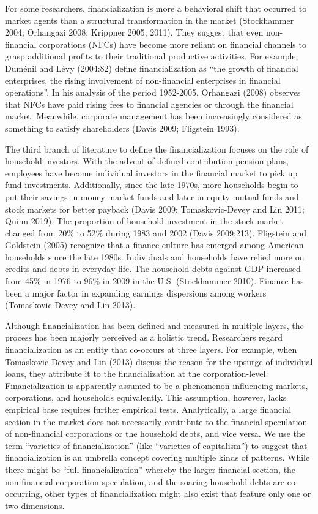 \documentclass[
]{article}
\begin{document}
For some researchers, financialization is more a behavioral shift that
occurred to market agents than a structural transformation in the market
(Stockhammer 2004; Orhangazi 2008; Krippner 2005; 2011). They suggest
that even non-financial corporations (NFCs) have become more reliant on
financial channels to grasp additional profits to their traditional
productive activities. For example, Duménil and Lévy (2004:82) define
financialization as ``the growth of financial enterprises, the rising
involvement of non-financial enterprises in financial operations''. In
his analysis of the period 1952-2005, Orhangazi (2008) observes that
NFCs have paid rising fees to financial agencies or through the
financial market. Meanwhile, corporate management has been increasingly
considered as something to satisfy shareholders (Davis 2009; Fligstein
1993).

The third branch of literature to define the financialization focuses on
the role of household investors. With the advent of defined contribution
pension plans, employees have become individual investors in the
financial market to pick up fund investments. Additionally, since the
late 1970s, more households begin to put their savings in money market
funds and later in equity mutual funds and stock markets for better
payback (Davis 2009; Tomaskovic-Devey and Lin 2011; Quinn 2019). The
proportion of household investment in the stock market changed from 20\%
to 52\% during 1983 and 2002 (Davis 2009:213). Fligstein and Goldstein
(2005) recognize that a finance culture has emerged among American
households since the late 1980s. Individuals and households have relied
more on credits and debts in everyday life. The household debts against
GDP increased from 45\% in 1976 to 96\% in 2009 in the U.S. (Stockhammer
2010). Finance has been a major factor in expanding earnings dispersions
among workers (Tomaskovic-Devey and Lin 2013).

Although financialization has been defined and measured in multiple
layers, the process has been majorly perceived as a holistic trend.
Researchers regard financialization as an entity that co-occurs at three
layers. For example, when Tomaskovic-Devey and Lin (2013) discuss the
reason for the upsurge of individual loans, they attribute it to the
financialization at the corporation-level. Financialization is
apparently assumed to be a phenomenon influencing markets, corporations,
and households equivalently. This assumption, however, lacks empirical
base requires further empirical tests. Analytically, a large financial
section in the market does not necessarily contribute to the financial
speculation of non-financial corporations or the household debts, and
vice versa. We use the term ``varieties of financialization'' (like
``varieties of capitalism'') to suggest that financialization is an
umbrella concept covering multiple kinds of patterns. While there might
be ``full financialization'' whereby the larger financial section, the
non-financial corporation speculation, and the soaring household debts
are co-occurring, other types of financialization might also exist that
feature only one or two dimensions.
\end{document}
